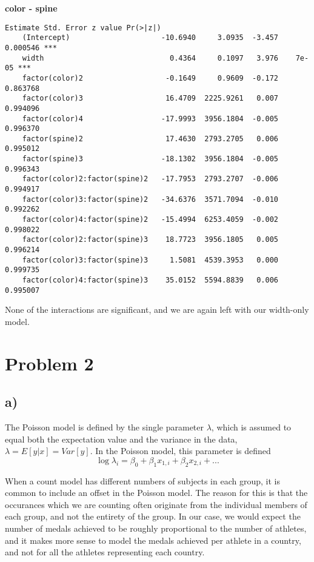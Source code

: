 \documentclass[a4paper, twocolumn]{article}
\begin{document}
\textbf{color - spine}
\begin{Verbatim}[fontsize=\scriptsize]
                                    Estimate Std. Error z value Pr(>|z|)    
    (Intercept)                     -10.6940     3.0935  -3.457 0.000546 ***
    width                             0.4364     0.1097   3.976    7e-05 ***
    factor(color)2                   -0.1649     0.9609  -0.172 0.863768    
    factor(color)3                   16.4709  2225.9261   0.007 0.994096    
    factor(color)4                  -17.9993  3956.1804  -0.005 0.996370    
    factor(spine)2                   17.4630  2793.2705   0.006 0.995012    
    factor(spine)3                  -18.1302  3956.1804  -0.005 0.996343    
    factor(color)2:factor(spine)2   -17.7953  2793.2707  -0.006 0.994917    
    factor(color)3:factor(spine)2   -34.6376  3571.7094  -0.010 0.992262    
    factor(color)4:factor(spine)2   -15.4994  6253.4059  -0.002 0.998022    
    factor(color)2:factor(spine)3    18.7723  3956.1805   0.005 0.996214    
    factor(color)3:factor(spine)3     1.5081  4539.3953   0.000 0.999735    
    factor(color)4:factor(spine)3    35.0152  5594.8839   0.006 0.995007
\end{Verbatim}

None of the interactions are significant, and we are again left with our width-only model.



\section*{Problem 2}
\subsection*{a)}
The Poisson model is defined by the single parameter $\lambda$, which is assumed to equal both the expectation value and the variance in the data, $\lambda = E[y|x] = Var[y]$. In the Poisson model, this parameter is defined 
\begin{equation}
    \log{\lambda_i} = \beta_0 + \beta_1 x_{1,i} + \beta_2 x_{2,i} + ...
\end{equation}

When a count model has different numbers of subjects in each group, it is common to include an offset in the Poisson model. The reason for this is that the occurances which we are counting often originate from the individual members of each group, and not the entirety of the group. In our case, we would expect the number of medals achieved to be roughly proportional to the number of athletes, and it makes more sense to model the medals achieved per athlete in a country, and not for all the athletes representing each country.
\end{document}
